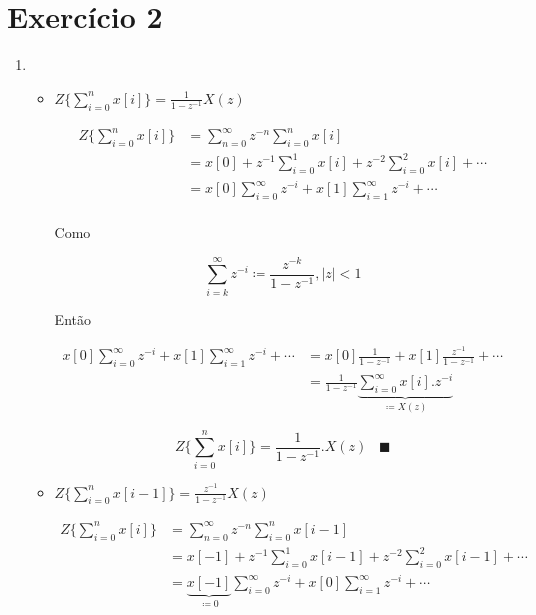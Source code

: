\documentclass{article}
\begin{document}
\section*{Exercício 2}
\begin{enumerate}
\item %

\begin{itemize}
	\item $Z\{\sum_{i=0}^{n}x[i] \} = \frac{1}{1-z^{-1}}X(z)$
	
	\begin{equation}
	\begin{split}
	Z\{\sum_{i=0}^{n}x[i] \} & = \sum_{n=0}^{\infty} z^{-n} \sum_{i=0}^{n} x[i] \\
	& = x[0] + z^{-1} \sum_{i=0}^{1} x[i] + z^{-2} \sum_{i=0}^{2} x[i] + \cdots \\
	& = x[0] \sum_{i=0}^{\infty} z^{-i} + x[1] \sum_{i=1}^{\infty} z^{-i} + \cdots \\
	\end{split}
	\end{equation}

	Como

	\begin{equation}
	\label{eq:pgsoma}
	\sum_{i=k}^{\infty} z^{-i} \coloneq \frac{z^{-k}}{1 - z^{-1}}, |z|<1
	\end{equation}
	
	Então
	
	\begin{equation}
	\begin{split}
	x[0] \sum_{i=0}^{\infty} z^{-i} + x[1] \sum_{i=1}^{\infty} z^{-i} + \cdots & = 
	x[0] \frac{1}{1 - z^{-1}} + x[1] \frac{z^{-1}}{1 - z^{-1}} + \cdots \\
	& = \frac{1}{1 - z^{-1}} \underbrace{\sum_{i=0}^{\infty} x[i].z^{-i}}_{\coloneqq X(z)}
	\end{split}
	\end{equation}
	
	\begin{equation}
	Z\{\sum_{i=0}^{n}x[i] \} = \frac{1}{1-z^{-1}}.X(z) \hspace{10pt} \blacksquare
	\end{equation}
	
	\item $Z\{\sum_{i=0}^{n}x[i-1] \} = \frac{z^{-1}}{1-z^{-1}}X(z)$

	\begin{equation}
	\begin{split}
	Z\{\sum_{i=0}^{n}x[i] \} & = \sum_{n=0}^{\infty} z^{-n} \sum_{i=0}^{n} x[i-1] \\
	& = x[-1] + z^{-1} \sum_{i=0}^{1} x[i-1] + z^{-2} \sum_{i=0}^{2} x[i-1] + \cdots \\
	& = \underbrace{x[-1]}_{\coloneqq 0} \sum_{i=0}^{\infty} z^{-i} + x[0] \sum_{i=1}^{\infty} z^{-i} + \cdots \\
	& 
	\end{split}
	\end{equation}


\end{itemize}
\end{enumerate}
\end{document}
